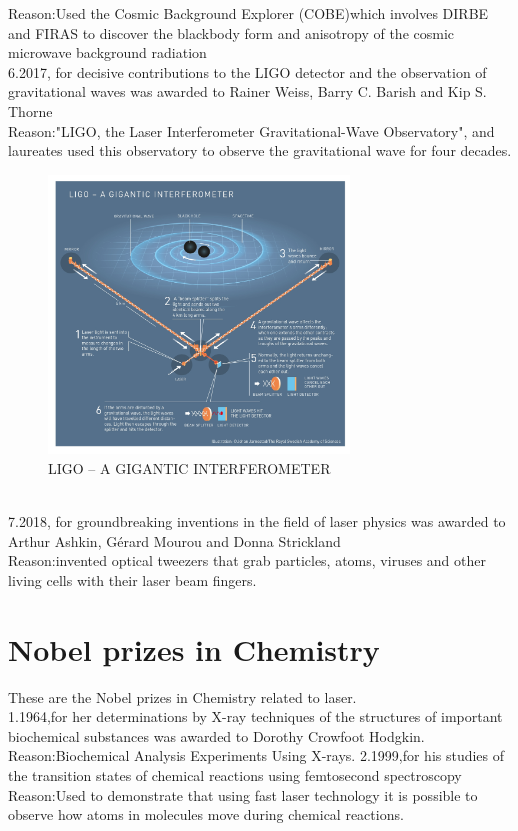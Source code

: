 \documentclass[12pt, a4paper, oneside]{article}
\begin{document}
\begin{spacing}{2.0}
Reason:Used the Cosmic Background Explorer (COBE)which involves DIRBE\cite{RN07} and FIRAS\cite{RN08} to discover the blackbody form and anisotropy of the cosmic microwave background radiation\\
6.2017, for decisive contributions to the LIGO detector and the observation of gravitational waves\cite{RN05} was awarded to Rainer Weiss, Barry C. Barish and Kip S. Thorne\\
Reason:"LIGO, the Laser Interferometer Gravitational-Wave Observatory", and laureates used this observatory to observe the gravitational wave for four decades.\\
\begin{figure}[htbp]
    \centering
    \includegraphics[width=8cm]{fig_fy_en_17_LIGO_page-0001.jpg}
    \caption{LIGO – A GIGANTIC INTERFEROMETER}
\end{figure}\\
7.2018, for groundbreaking inventions in the field of laser physics\cite{RN04} was awarded to Arthur Ashkin, Gérard Mourou and Donna Strickland\\
Reason:invented optical tweezers that grab particles, atoms, viruses and other living cells with their laser beam fingers.\cite{RN03}\\


\section{Nobel prizes in Chemistry}
These are the Nobel prizes in Chemistry related to laser.\\
1.1964,for her determinations by X-ray techniques of the structures of important biochemical substances\cite{RN14} was awarded to Dorothy Crowfoot Hodgkin.
Reason:Biochemical Analysis Experiments Using X-rays.\cite{HodgkinDorothy1937Xrca}
2.1999,for his studies of the transition states of chemical reactions using femtosecond spectroscopy
Reason:Used to demonstrate that using fast laser technology it is possible to observe how atoms in molecules move during chemical reactions.
\end{spacing}{}



\end{document}

